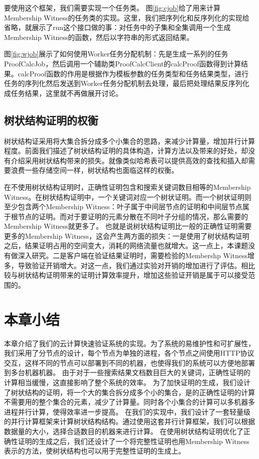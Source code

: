 要使用这个框架，我们需要实现一个任务类。
图\ref{fig:cjob}给了用来计算Membership Witness的任务类的实现。这里，我们把序列化和反序列化的实现给省略，就展示了run这个接口做的事：对任务中的子集和全集调用一个生成Membership Witness的函数，然后以字符串的形式返回结果。


图\ref{fig:wjob}展示了如何使用Worker任务分配机制：先是生成一系列的任务ProofCalcJob，然后调用一个辅助类ProofCalcClient的calcProof函数得到计算结果。calcProof函数的作用是根据作为模板参数的任务类型和任务结果类型，进行任务的序列化然后发送到Worker任务分配机制去处理，最后把处理结果反序列化成任务结果，这里就不再做展开讨论。
\subsection{树状结构证明的权衡}
树状结构证采用将大集合拆分成多个小集合的思路，来减少计算量，增加并行计算程度。前面我们描述了树状结构证明的具体构造，计算方法以及带来的好处，却没有介绍采用树状结构带来的损失。就像类似哈希表可以提供高效的查找和插入却需要浪费一些存储空间一样，树状结构也面临这样的权衡。

在不使用树状结构证明时，正确性证明包含和搜索关键词数目相等的Membership Witness。在树状结构证明中，一个关键词对应一个树状证明。而一个树状证明则至少包含两个Membership Witness：叶子属于中间层节点的证明和中间层节点属于根节点的证明。而对于要证明的元素分散在不同叶子分组的情况，那么需要的Membership Witness就更多了。
也就是说树状结构证明比一般的正确性证明需要更多的Membership Witness，这会产生两方面的损失：一是使用了树状结构证明之后，结果证明占用的空间变大，消耗的网络流量也就增大。这一点上，本课题没有做深入研究。二是客户端在验证结果证明时，需要检验的Membershp Witness增多，导致验证开销增大。对这一点，我们通过实验对开销的增加进行了评估。相比较与树状结构证明带来的证明计算效率提升，增加这些验证开销是属于可以接受范围的。

\section{本章小结}
本章介绍了我们的云计算快速验证系统的实现。为了系统的易维护性和可扩展性，我们采用了分节点的设计，每个节点为单独的进程，各个节点之间使用HTTP协议交互，这样不同的节点可以部署到不同的机器，也使得我们的系统可以方便地部署到多台机器机器。
由于对于一些搜索结果文档数目巨大的关键词，正确性证明的计算相当缓慢，这直接影响了整个系统的效率。
为了加快证明的生成，我们设计了树状结构的证明，将一个大的集合拆分成多个小的集合，是的正确性证明的计算不需要用的整个集合的元素，减少了计算量。同时各个小集合的计算可以多机器多进程并行计算，使得效率进一步提高。
在我们的实现中，我们设计了一套轻量级的并行计算框架来计算树状结构结构。通过使用这套并行计算框架，我们可以根据数据量的大小，选择合适数目的机器来进行计算。
在使用树状结构证明优化了正确性证明的生成之后，我们还设计了一个将完整性证明也用Membership Witness表示的方法，使树状结构也可以用于完整性证明的生成上。
